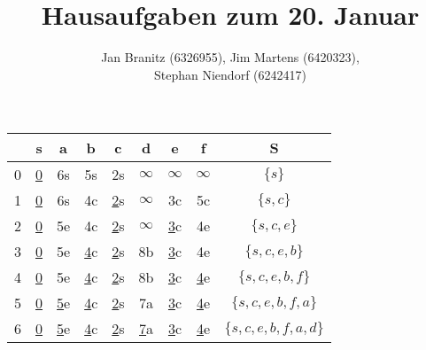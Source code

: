 \documentclass[10pt,a4paper,oneside,ngerman,numbers=noenddot]{scrartcl}
\begin{document}
\author{Jan Branitz (6326955), Jim Martens (6420323),\\
Stephan Niendorf (6242417)}
\title{Hausaufgaben zum 20. Januar}
\maketitle
\section{} %
	\subsection{} %
		\begin{tabular}{c|c|c|c|c|c|c|c|c}
			& s & a & b & c & d & e & f & S\\
			\hline
			0 & \underline{0} & 6s & 5s & 2s & $\infty$ & $\infty$ & $\infty$ & $\{s\}$ \\
			1 & \underline{0} & 6s & 4c & \underline{2}s & $\infty$ & 3c & 5c & $\{s,c\}$ \\
			2 & \underline{0} & 5e & 4c & \underline{2}s & $\infty$ & \underline{3}c & 4e & $\{s,c,e\}$ \\
			3 & \underline{0} & 5e & \underline{4}c & \underline{2}s & 8b & \underline{3}c & 4e & $\{s,c,e,b\}$ \\
			4 & \underline{0} & 5e & \underline{4}c & \underline{2}s & 8b & \underline{3}c & \underline{4}e & $\{s,c,e,b,f\}$ \\
			5 & \underline{0} & \underline{5}e & \underline{4}c & \underline{2}s & 7a & \underline{3}c & \underline{4}e & $\{s,c,e,b,f,a\}$ \\
			6 & \underline{0} & \underline{5}e & \underline{4}c & \underline{2}s & \underline{7}a & \underline{3}c & \underline{4}e & $\{s,c,e,b,f,a,d\}$ \\
		\end{tabular}
		
\end{document}
